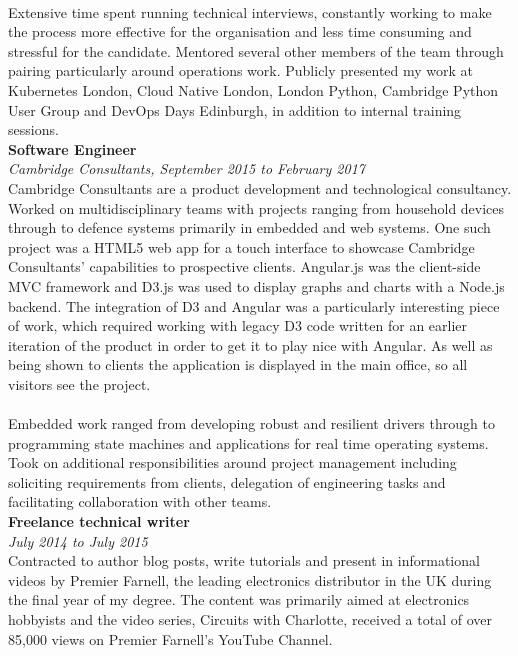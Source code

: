 \documentclass{article}
\begin{document}
\begin{flushleft}
\paragraph{}Extensive time spent running technical interviews, constantly working to make the process more effective for the organisation and less time consuming and stressful for the candidate. Mentored several other members of the team through pairing particularly around operations work. Publicly presented my work at Kubernetes London, Cloud Native London, London Python, Cambridge Python User Group and DevOps Days Edinburgh, in addition to internal training sessions.\\[10pt]

\textbf{Software Engineer}\\
\textit{Cambridge Consultants, September 2015 to February 2017}\\[5pt]
Cambridge Consultants are a product development and technological consultancy. Worked on multidisciplinary teams with projects ranging from household devices through to defence systems primarily in embedded and web systems. One such project was a HTML5 web app for a touch interface to showcase Cambridge Consultants' capabilities to prospective clients. Angular.js was the client-side MVC framework and D3.js was used to display graphs and charts with a Node.js backend. The integration of D3 and Angular was a particularly interesting piece of work, which required working with legacy D3 code written for an earlier iteration of the product in order to get it to play nice with Angular. As well as being shown to clients the application is displayed in the main office, so all visitors see the project.

\paragraph{}Embedded work ranged from developing robust and resilient drivers through to programming state machines and applications for real time operating systems. Took on additional responsibilities around project management including soliciting requirements from clients, delegation of engineering tasks and facilitating collaboration with other teams.\\[10pt]

\textbf{Freelance technical writer}\\
\textit{July 2014 to July 2015}\\[5pt]
Contracted to author blog posts, write tutorials and present in informational videos by Premier Farnell, the leading electronics distributor in the UK during the final year of my degree. The content was primarily aimed at electronics hobbyists and the video series, Circuits with Charlotte, received a total of over 85,000 views on Premier Farnell's YouTube Channel.


\end{flushleft}
\end{document}
